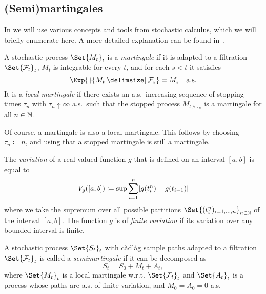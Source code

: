 \subsection{(Semi)martingales}

In  we will use various concepts and tools from stochastic calculus, which we will briefly enumerate here.
A more detailed explanation can be found in~\cite{klebanerIntroductionStochasticCalculus2012}.

\begin{definition}
  A stochastic process \(\Set{M_t}_{t}\) is a \textit{martingale} if it is adapted to a filtration \(\Set{\cF_t}_t\), \( M_t \) is integrable for every \(t\), and for each \( s < t \) it satisfies
  \begin{equation}
    \Exp{}{M_t \given \cF_s} = M_s \quad \text{a.s.}
  \end{equation}
  It is a \textit{local martingale} if there exists an a.s.\ increasing sequence of stopping times \( \tau_n \) with \( \tau_n \uparrow \infty \) a.s.\ such that the stopped process \( M_{t \land \tau_n} \) is a martingale for all \( n \in \mathbb{N} \). %
\end{definition}

Of course, a martingale is also a local martingale.
This follows by choosing \( \tau_n \coloneqq n \), and using that a stopped martingale is still a martingale.

\begin{definition}
  The \textit{variation} of a real-valued function \( g \) that is defined on an interval \( [a,b] \) is equal to
  \begin{equation}
    V_g([a,b]) \coloneqq \sup \sum_{i=1}^n \lvert g(t_i^n) - g(t_{i-1}) \rvert
  \end{equation}
  where we take the supremum over all possible partitions \(\Set{(t_i^n)_{i=1,\dots,n}}_{n\in\bN}\) of the interval \( [a,b] \).
  The function \( g \) is of \textit{finite variation} if its variation over any bounded interval is finite.
\end{definition}

\begin{definition}
  A stochastic process \(\Set{S_t}_{t}\) with càdlàg sample paths adapted to a filtration \(\Set{\cF_t}_t\) is called a \textit{semimartingale} if it can be decomposed as
  \begin{equation}
    S_t = S_0 + M_t + A_t,
  \end{equation}
  where \( \Set{M_t}_{t} \) is a local martingale w.r.t. \(\Set{\cF_t}_t\) and \( \Set{A_t}_{t} \) is a process whose paths are a.s. of finite variation, and \( M_0 = A_0 = 0 \) a.s.
\end{definition}

